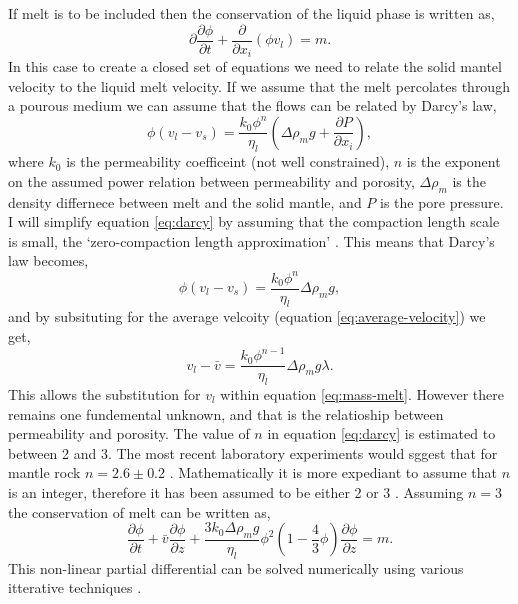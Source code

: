 If melt is to be included then the conservation of the liquid phase is written as,
\begin{equation}
\partial
\frac{\partial \phi}{\partial t} + \frac{\partial}{\partial x_{i}}\left( \phi v_{l} \right) = m.
\label{eq:mass-melt}
\end{equation}
In this case to create a closed set of equations we need to relate the solid mantel velocity to the liquid melt velocity. If we assume that the melt percolates through a pourous medium we can assume that the flows can be related by Darcy's law,
\begin{equation}
\phi\left( v_{l}-v_{s} \right) = \frac{k_{0}\phi^{n}}{\eta_{l}}\left( \Delta\rho_{m}g + \frac{\partial P}{\partial x_{i}} \right),
\label{eq:darcy}
\end{equation}
where $k_{0}$ is the permeability coefficeint (not well constrained), $n$ is the exponent on the assumed power relation between permeability and porosity, $\Delta\rho_{m}$ is the density differnece between melt and the solid mantle, and $P$ is the pore pressure. I will simplify equation \ref{eq:darcy} by assuming that the compaction length scale is small, the `zero-compaction length approximation' \citep{ribe-1985}. This means that Darcy's law becomes,
\begin{equation}
\phi\left( v_{l}-v_{s} \right) = \frac{k_{0}\phi^{n}}{\eta_{l}}\Delta\rho_{m}g,
\end{equation}
and by subsituting for the average velcoity (equation \ref{eq:average-velocity}) we get,
\begin{equation}
v_{l}-\bar{v} = \frac{k_{0}\phi^{n-1}}{\eta_{l}}\Delta\rho_{m}g\lambda.
\end{equation}
This allows the substitution for $v_{l}$ within equation \ref{eq:mass-melt}. However there remains one fundemental unknown, and that is the relatioship between permeability and porosity. The value of $n$ in equation \ref{eq:darcy} is estimated to between 2 and 3. The most recent laboratory experiments would sggest that for mantle rock $n = 2.6\pm0.2$ \citep{miller-etal-2014}. Mathematically it is more expediant to assume that $n$ is an integer, therefore it has been assumed to be either 2 \citep[e.g.][]{scott-1989,goes-etal-2012} or 3 \citep[e.g.][]{hewitt-??,armitage-etal-grl-2019}. Assuming $n=3$ the conservation of melt can be written as,
\begin{equation}
\frac{\partial \phi}{\partial t} + \bar{v}\frac{\partial \phi}{\partial z} + \frac{3k_{0}\Delta\rho_{m}g}{\eta_{l}}\phi^{2}\left( 1-\frac{4}{3}\phi \right)\frac{\partial \phi}{\partial z} = m.
\end{equation}
This non-linear partial differential can be solved numerically using various itterative techniques \citep[e.g.][]{armitage-etal-grl-2019,franken-etal-2020}.

